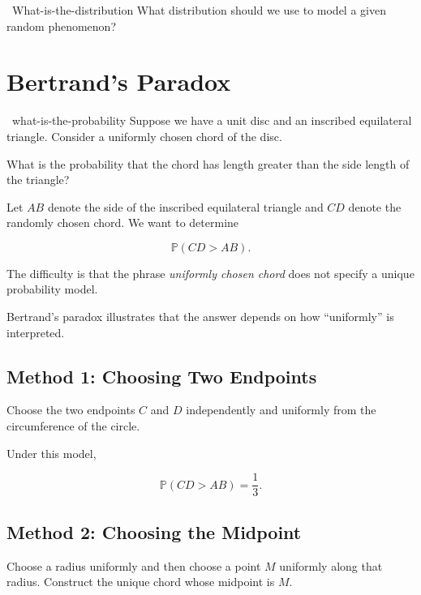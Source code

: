 \begin{question}{~}{What-is-the-distribution}
What distribution should we use to model a given random phenomenon?
\end{question}

\section{Bertrand's Paradox}

\begin{question}{~}{what-is-the-probability}
Suppose we have a unit disc and an inscribed equilateral triangle.
Consider a uniformly chosen chord of the disc.

What is the probability that the chord has length greater than the
side length of the triangle?
\end{question}


Let $AB$ denote the side of the inscribed equilateral triangle and
$CD$ denote the randomly chosen chord. We want to determine

\[
\mathbb{P}(CD>AB).
\]

The difficulty is that the phrase \emph{uniformly chosen chord} does
not specify a unique probability model.

\begin{remark}

Bertrand's paradox illustrates that the answer depends on how
``uniformly'' is interpreted.

\end{remark}

\subsection{Method 1: Choosing Two Endpoints}

Choose the two endpoints $C$ and $D$ independently and uniformly from
the circumference of the circle.

Under this model,

\[
\mathbb{P}(CD>AB)=\frac13.
\]

\subsection{Method 2: Choosing the Midpoint}

Choose a radius uniformly and then choose a point $M$ uniformly along
that radius. Construct the unique chord whose midpoint is $M$.

